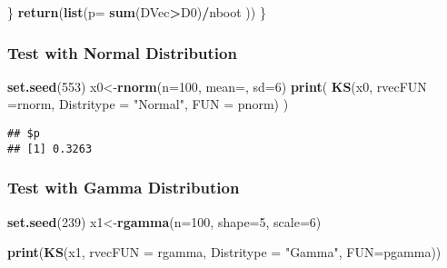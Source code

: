 \documentclass[]{article}
\newenvironment{Shaded}{\begin{snugshade}}{\end{snugshade}}
\newcommand{\DataTypeTok}[1]{\textcolor[rgb]{0.13,0.29,0.53}{#1}}
\newcommand{\DecValTok}[1]{\textcolor[rgb]{0.00,0.00,0.81}{#1}}
\newcommand{\KeywordTok}[1]{\textcolor[rgb]{0.13,0.29,0.53}{\textbf{#1}}}
\newcommand{\NormalTok}[1]{#1}
\newcommand{\OperatorTok}[1]{\textcolor[rgb]{0.81,0.36,0.00}{\textbf{#1}}}
\newcommand{\StringTok}[1]{\textcolor[rgb]{0.31,0.60,0.02}{#1}}
\begin{document}
\begin{Shaded}
\begin{Highlighting}[]
\NormalTok{  \}}
  \KeywordTok{return}\NormalTok{(}\KeywordTok{list}\NormalTok{(}\DataTypeTok{p=} \KeywordTok{sum}\NormalTok{(DVec}\OperatorTok{>}\NormalTok{D0)}\OperatorTok{/}\NormalTok{nboot ))}
\NormalTok{\}}
\end{Highlighting}
\end{Shaded}

\hypertarget{test-with-normal-distribution}{%
\subsubsection{Test with Normal
Distribution}\label{test-with-normal-distribution}}

\begin{Shaded}
\begin{Highlighting}[]
\KeywordTok{set.seed}\NormalTok{(}\DecValTok{553}\NormalTok{)}
\NormalTok{x0<-}\KeywordTok{rnorm}\NormalTok{(}\DataTypeTok{n=}\DecValTok{100}\NormalTok{, }\DataTypeTok{mean=}\NormalTok{, }\DataTypeTok{sd=}\DecValTok{6}\NormalTok{)}
\KeywordTok{print}\NormalTok{( }\KeywordTok{KS}\NormalTok{(x0, }\DataTypeTok{rvecFUN =}\NormalTok{rnorm, }\DataTypeTok{Distritype =} \StringTok{"Normal"}\NormalTok{, }\DataTypeTok{FUN =}\NormalTok{ pnorm) )}
\end{Highlighting}
\end{Shaded}

\begin{verbatim}
## $p
## [1] 0.3263
\end{verbatim}

\hypertarget{test-with-gamma-distribution}{%
\subsubsection{Test with Gamma
Distribution}\label{test-with-gamma-distribution}}

\begin{Shaded}
\begin{Highlighting}[]
\KeywordTok{set.seed}\NormalTok{(}\DecValTok{239}\NormalTok{)}
\NormalTok{x1<-}\KeywordTok{rgamma}\NormalTok{(}\DataTypeTok{n=}\DecValTok{100}\NormalTok{, }\DataTypeTok{shape=}\DecValTok{5}\NormalTok{, }\DataTypeTok{scale=}\DecValTok{6}\NormalTok{)}

\KeywordTok{print}\NormalTok{(}\KeywordTok{KS}\NormalTok{(x1, }\DataTypeTok{rvecFUN =}\NormalTok{ rgamma, }\DataTypeTok{Distritype =} \StringTok{"Gamma"}\NormalTok{, }\DataTypeTok{FUN=}\NormalTok{pgamma))}
\end{Highlighting}
\end{Shaded}
\end{document}
